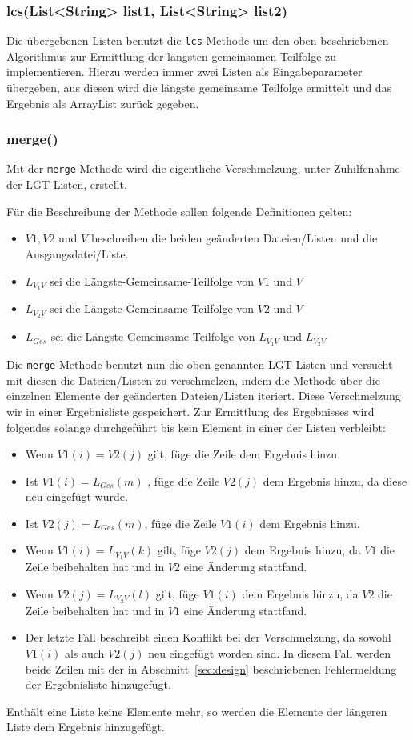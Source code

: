 \documentclass[a4paper,titlepage,12pt]{scrartcl}
\begin{document}
\subsubsection{lcs(List<String> list1, List<String> list2)}
\label{sec:lcs}
Die übergebenen Listen benutzt die \texttt{lcs}-Methode um den oben beschriebenen Algorithmus zur Ermittlung der längsten gemeinsamen Teilfolge zu implementieren.
Hierzu werden immer zwei Listen als Eingabeparameter übergeben, aus diesen wird die längste gemeinsame Teilfolge ermittelt und das Ergebnis als ArrayList zurück gegeben.

\subsubsection{merge()}
\label{sec:merge}
Mit der \texttt{merge}-Methode wird die eigentliche Verschmelzung, unter Zuhilfenahme der LGT-Listen, erstellt.

Für die Beschreibung der Methode sollen folgende Definitionen gelten:
\begin{itemize}
\item $V1 , V2$ und $V$ beschreiben die beiden geänderten Dateien/Listen und die Ausgangsdatei/Liste.
\item $L_{V_{1}V}$ sei die Längste-Gemeinsame-Teilfolge von $V1$ und $V$
\item $L_{V_{2}V}$ sei die Längste-Gemeinsame-Teilfolge von $V2$ und $V$
\item $L_{Ges}$ sei die Längste-Gemeinsame-Teilfolge von $L_{V_{1}V}$ und $L_{V_{2}V}$
\end{itemize}

Die \texttt{merge}-Methode benutzt nun die oben genannten LGT-Listen und versucht mit diesen die Dateien/Listen zu verschmelzen,
indem die Methode über die einzelnen Elemente der geänderten Dateien/Listen iteriert. Diese Verschmelzung wir in einer Ergebnisliste gespeichert.
Zur Ermittlung des Ergebnisses wird folgendes solange durchgeführt bis kein Element in einer der Listen verbleibt:
\begin{itemize}
\item Wenn $V1(i) = V2(j)$ gilt, füge die Zeile dem Ergebnis hinzu.
\item Ist $V1(i) = L_{Ges}(m)$ , füge die Zeile $V2(j)$ dem Ergebnis hinzu, da diese neu eingefügt wurde.
\item Ist $V2(j) = L_{Ges}(m)$, füge die Zeile $V1(i)$ dem Ergebnis hinzu.
\item Wenn $V1(i) = L_{V_{1}V}(k)$ gilt, füge $V2(j)$ dem Ergebnis hinzu, da $V1$ die Zeile beibehalten hat und in $V2$ eine Änderung stattfand.
\item Wenn $V2(j) = L_{V_{2}V}(l)$ gilt, füge $V1(i)$ dem Ergebnis hinzu, da $V2$ die Zeile beibehalten hat und in $V1$ eine Änderung stattfand.
\item Der letzte Fall beschreibt einen Konflikt bei der Verschmelzung, da sowohl $V1(i)$ als auch $V2(j)$ neu eingefügt worden sind. In diesem Fall werden beide Zeilen mit der in Abschnitt~\ref{sec:design} beschriebenen Fehlermeldung der Ergebnisliste hinzugefügt.
\end{itemize}
Enthält eine Liste keine Elemente mehr, so werden die Elemente der längeren Liste dem Ergebnis hinzugefügt.
\end{document}
